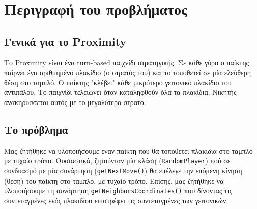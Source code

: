 \chapter{Περιγραφή του προβλήματος}

\section{Γενικά για το Proximity}
Το Proximity \cite{proximitygame}
είναι ένα turn-based παιχνίδι στρατηγικής.
Σε κάθε γύρο ο παίκτης παίρνει ένα αριθμημένο πλακίδιο (ο στρατός του)
και το τοποθετεί σε μία ελεύθερη θέση στο ταμπλό.
Ο παίκτης "κλέβει" κάθε μικρότερο γειτονικό πλακίδιο του αντιπάλου.
Το παιχνίδι τελειώνει όταν καταληφθούν όλα τα πλακίδια.
Νικητής ανακηρύσσεται αυτός με το μεγαλύτερο στρατό.

\section{Το πρόβλημα}
Μας ζητήθηκε να υλοποιήσουμε έναν παίκτη που θα τοποθετεί πλακίδια στο
ταμπλό με τυχαίο τρόπο.
Ουσιαστικά, ζητούνταν μία κλάση (\lstinline!RandomPlayer!) πού σε
συνδυασμό με μία συνάρτηση (\lstinline!getNextMove()!) θα επέλεγε την επόμενη
κίνηση (θέση) του παίκτη στο ταμπλό, με τυχαίο τρόπο.
Επίσης, μας ζητήθηκε να
υλοποιήσουμε τη συνάρτηση \lstinline!getNeighborsCoordinates()! που δίνοντας τις
συντεταγμένες ενός πλακιδίου επιστρέφει τις συντεταγμένες των γειτονικών.
